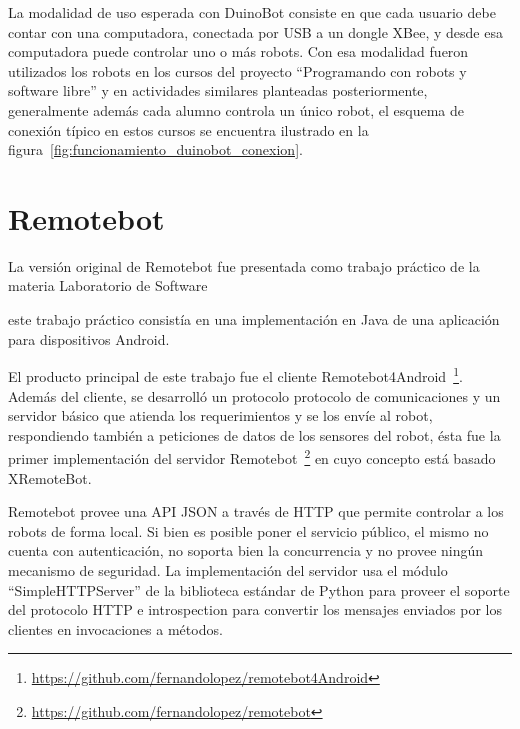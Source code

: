 La modalidad de uso esperada con DuinoBot consiste en que cada usuario
debe contar con una computadora, conectada por USB a un dongle XBee,
y desde esa computadora puede controlar uno o más robots. Con esa modalidad
fueron utilizados los robots en los cursos del proyecto
``Programando con robots y software libre'' y en actividades similares
planteadas posteriormente, generalmente además cada alumno controla
un único robot, el esquema de conexión típico en estos cursos se encuentra
ilustrado en la figura~\ref{fig:funcionamiento_duinobot_conexion}.

\section{Remotebot}\label{ch2:remotebot}

La versión original de Remotebot fue presentada como trabajo práctico
de la materia Laboratorio de Software

este trabajo práctico consistía
en una implementación en Java de una aplicación para dispositivos Android. 


El producto principal de este trabajo fue el cliente
Remotebot4Android~\footnote{\url{https://github.com/fernandolopez/remotebot4Android}}. Además del cliente, se desarrolló un protocolo protocolo de comunicaciones
y un servidor básico que atienda los requerimientos y se los envíe al
robot, respondiendo también a peticiones de datos de los sensores del
robot, ésta fue la primer implementación del servidor
Remotebot~\footnote{\url{https://github.com/fernandolopez/remotebot}}
en cuyo concepto está basado XRemoteBot.

Remotebot provee una API JSON a través de HTTP que permite controlar a los
robots de forma local. Si bien es posible poner el servicio público,
el mismo no cuenta con autenticación, no soporta bien la concurrencia
y no provee ningún mecanismo de seguridad. La implementación del servidor
usa el módulo ``SimpleHTTPServer'' de la biblioteca estándar de Python para
proveer el soporte del protocolo HTTP e introspection para convertir los
mensajes enviados por los clientes en invocaciones a métodos.

